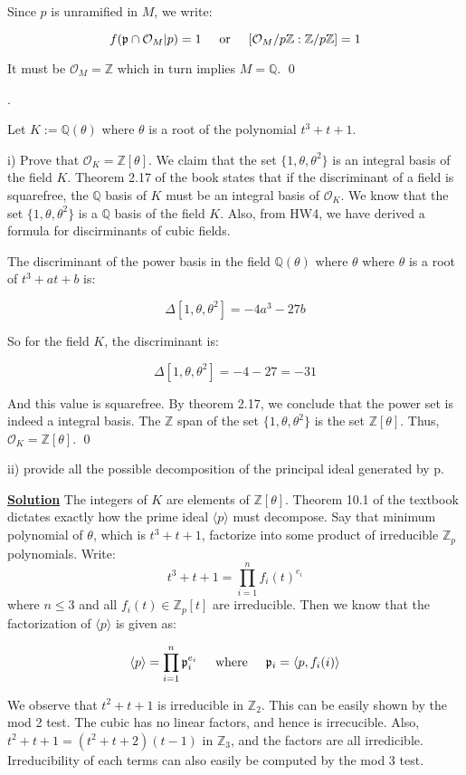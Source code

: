 \documentclass{article}
\newcommand{\new}[1]{
    \vspace{2mm}
    \noindent
    \textbf{
    \underline{#1}}
}
\def\ZZ{{\mathbb{Z}}}
\newcounter{problemcnt}
\newcommand{\Problem}{{
    \vspace{5mm}
    \stepcounter{problemcnt}
    \noindent
    \arabic{problemcnt}. 
}
}
\newcommand{\textOr}{
    \hspace{5mm}
    \textrm{or}
    \hspace{5mm}
}
\newcommand{\textWhere}{
    \hspace{5mm}
    \textrm{where}
    \hspace{5mm}
}
\newcommand{\<}{{{
    \langle
}}}
\def\>{{{
    \rangle
}}}
\def\ZZ{{\mathbb{Z}}}
\newcommand{\ringInt}{
    {\mathcal{O}}
}
\newcommand{\pideal}{
    {{\mathfrak{p}}}
}
\def\QQ{\mathbb{Q}}
\begin{document}
Since $p$ is unramified in $M$, we write:

\[
    f( \pideal \cap \ringInt_M|p) = 1
    \textOr
    [\ringInt_M/p\ZZ : \ZZ/p\ZZ] = 1
\]

It must be $\ringInt_M = \ZZ$ which in turn implies 
$M = \QQ$. \qed

\Problem 
Let $K := \QQ(\theta)$ where $\theta$ is a root of the polynomial 
$t^3 + t + 1$. 

i) Prove that $\ringInt_K = \ZZ[\theta]$. 
We claim that the set $\{1, \theta, \theta^2\}$ is an integral basis 
of the field $K$. Theorem 2.17 of the book states that if the 
discriminant of a field is squarefree, the $\QQ$ basis of $K$ 
must be an integral basis of $\ringInt_K$. We know that the set 
$\{1, \theta, \theta^2\}$ is a $\QQ$ basis of the field $K$. Also, 
from HW4, we have derived a formula for discirminants of cubic fields. 

The discriminant of the power basis in the field $\QQ(\theta)$ where $\theta$ where 
$\theta$ is a root of $t^3+at+b$ is:

\[
    \Delta [1, \theta, \theta^2] = -4a^3 - 27b
\]

So for the field $K$, the discriminant is:

\[
    \Delta[1, \theta, \theta^2] = -4-27 = -31
\]

And this value is squarefree. By theorem 2.17, we conclude that 
the power set is indeed a integral basis. The $\ZZ$ span of the 
set  $\{1, \theta, \theta^2\}$ is the set $\ZZ[\theta]$. Thus, 
$\ringInt_K = \ZZ[\theta]$. \qed

ii) provide all the possible decomposition of the principal 
ideal generated by p. 

\new{Solution} The integers of $K$ are elements of $\ZZ[\theta]$. 
Theorem 10.1 of the textbook dictates exactly how the prime ideal 
$\<p\>$ must decompose. Say that minimum polynomial of $\theta$, which 
is $t^3+t+1$, factorize into some product of irreducible $\ZZ_p$ polynomials. 
Write:
\[
    t^3+t+1 = \prod_{i = 1}^{n} f_i(t)^{e_i}
\]
where $n \leq 3$ and all $f_i(t) \in \ZZ_p[t]$ are irreducible. 
Then we know that the factorization of $\<p\>$ is given as:

\[
    \<p\> = \prod_{i = 1}^{n} \pideal_i^{e_i}
\textWhere \pideal_i = \<p, f_i(i)\>
\]

We observe that $t^2 + t + 1$ is irreducible in $\ZZ_2$.
This can be easily shown by the mod 2 test. The cubic 
has no linear factors, and hence is irrecucible.  
Also, $t^2+t+1 = (t^2+t+2)(t-1)$ in $\ZZ_3$, and the 
factors are all irredicible. Irreducibility of 
each terms can also easily be computed by the mod 3 test. 
\end{document}
